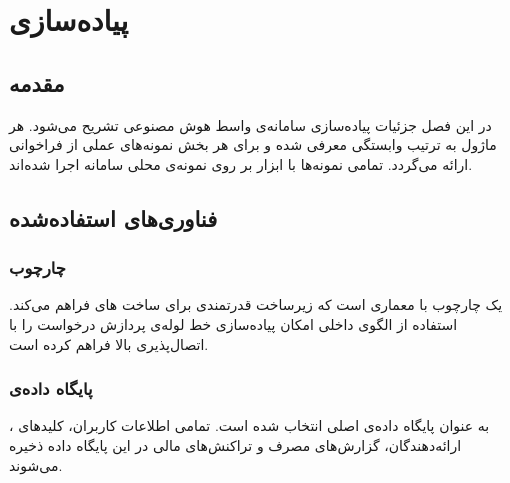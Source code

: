 \chapter{پیاده‌سازی}
\label{ch:implementation}

\section{مقدمه}

در این فصل جزئیات پیاده‌سازی سامانه‌ی واسط هوش مصنوعی تشریح می‌شود.
هر ماژول به ترتیب وابستگی معرفی شده و برای هر بخش نمونه‌های عملی از
فراخوانی  ارائه می‌گردد. تمامی نمونه‌ها با ابزار 
بر روی نمونه‌ی محلی سامانه اجرا شده‌اند.

\section{فناوری‌های استفاده‌شده}

\subsection{چارچوب }

 یک چارچوب  با معماری  است که زیرساخت قدرتمندی
برای ساخت های  فراهم می‌کند. استفاده از الگوی
 داخلی  امکان پیاده‌سازی خط لوله‌ی پردازش درخواست
را با اتصال‌پذیری بالا فراهم کرده است.

\subsection{پایگاه داده‌ی }

 به عنوان پایگاه داده‌ی اصلی انتخاب شده است.
تمامی اطلاعات کاربران، کلیدهای ، ارائه‌دهندگان، گزارش‌های مصرف
و تراکنش‌های مالی در این پایگاه داده ذخیره می‌شوند.

\subsection{}

